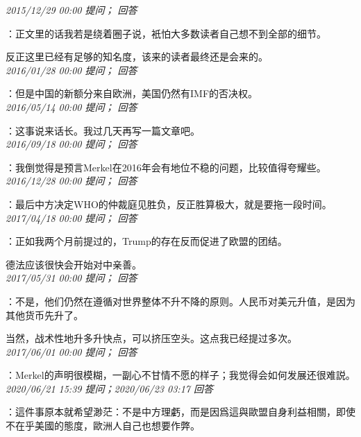 \documentclass[twocolumn]{ctexart}
\begin{document}
\textit{\hfill\noindent\small 2015/12/29 00:00 提问； 回答}

：正文里的话我若是绕着圈子说，衹怕大多数读者自己想不到全部的细节。

反正这里已经有足够的知名度，该来的读者最终还是会来的。\\

\textit{\hfill\noindent\small 2016/01/28 00:00 提问； 回答}

：但是中国的新额分来自欧洲，美国仍然有IMF的否决权。\\

\textit{\hfill\noindent\small 2016/05/14 00:00 提问； 回答}

：这事说来话长。我过几天再写一篇文章吧。\\

\textit{\hfill\noindent\small 2016/09/18 00:00 提问； 回答}

：我倒觉得是预言Merkel在2016年会有地位不稳的问题，比较值得夸耀些。\\

\textit{\hfill\noindent\small 2016/12/28 00:00 提问； 回答}

：最后中方决定WHO的仲裁庭见胜负，反正胜算极大，就是要拖一段时间。\\

\textit{\hfill\noindent\small 2017/04/18 00:00 提问； 回答}

：正如我两个月前提过的，Trump的存在反而促进了欧盟的团结。

德法应该很快会开始对中亲善。\\

\textit{\hfill\noindent\small 2017/05/31 00:00 提问； 回答}

：不是，他们仍然在遵循对世界整体不升不降的原则。人民币对美元升值，是因为其他货币先升了。

当然，战术性地升多升快点，可以挤压空头。这点我已经提过多次。\\

\textit{\hfill\noindent\small 2017/06/01 00:00 提问； 回答}

：Merkel的声明很模糊，一副心不甘情不愿的样子；我觉得会如何发展还很难説。\\

\textit{\hfill\noindent\small 2020/06/21 15:39 提问；2020/06/23 03:17 回答}

：這件事原本就希望渺茫：不是中方理虧，而是因爲這與歐盟自身利益相關，即使不在乎美國的態度，歐洲人自己也想要作弊。
\end{document}
